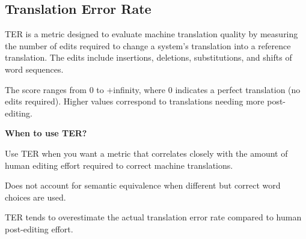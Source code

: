 \subsection{Translation Error Rate}

TER is a metric designed to evaluate machine translation quality by measuring the number of edits
required to change a system’s translation into a reference translation. The edits include insertions,
deletions, substitutions, and shifts of word sequences.

\begin{center}
\end{center}

The score ranges from 0 to +infinity, where 0 indicates a perfect translation (no edits required).
Higher values correspond to translations needing more post-editing.

\textbf{When to use TER?}

Use TER when you want a metric that correlates closely with the amount of human editing effort
required to correct machine translations.

{
\item Does not account for semantic equivalence when different but correct word choices are used.
\item TER tends to overestimate the actual translation error rate compared to human
post-editing effort.
}

\clearpage

\thispagestyle{customstyle}

